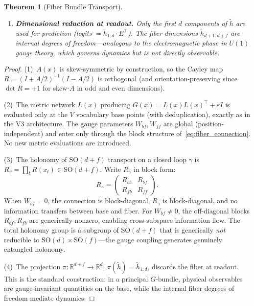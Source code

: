 \documentclass[11pt,letterpaper]{article}
\newtheorem{theorem}[conjecture]{Theorem}
\newcommand{\SO}{\mathrm{SO}}
\begin{document}
\begin{theorem}[Fiber Bundle Transport]
\begin{enumerate}
    \item \textbf{Dimensional reduction at readout.} Only the 
    first $d$ components of $\tilde{h}$ are used for prediction 
    (logits $= \tilde{h}_{1:d} \cdot E^\top$). The fiber 
    dimensions $\tilde{h}_{d+1:d+f}$ are internal degrees of 
    freedom---analogous to the electromagnetic phase in $U(1)$ 
    gauge theory, which governs dynamics but is not directly 
    observable.
\end{enumerate}
\end{theorem}

\begin{proof}
(1)~$A(x)$ is skew-symmetric by construction, so the Cayley map 
$R = (I + A/2)^{-1}(I - A/2)$ is orthogonal (and 
orientation-preserving since $\det R = +1$ for skew-$A$ in odd and 
even dimensions). 

(2)~The metric network $L(x)$ producing $G(x) = L(x)L(x)^\top + 
\varepsilon I$ is evaluated only at the $V$ vocabulary base points 
(with deduplication), exactly as in the V3 architecture. The gauge 
parameters $W_{bf}, W_{ff}$ are global (position-independent) and 
enter only through the block structure 
of~\eqref{eq:fiber_connection}. No new metric evaluations are 
introduced.

(3)~The holonomy of $\SO(d{+}f)$ transport on a closed loop 
$\gamma$ is $R_\gamma = \prod_{t} R(x_t) \in \SO(d{+}f)$. Write 
$R_\gamma$ in block form:
\[
    R_\gamma = \begin{pmatrix} R_{bb} & R_{bf} \\ R_{fb} & R_{ff}
    \end{pmatrix}.
\]
When $W_{bf} = 0$, the connection is block-diagonal, 
$R_\gamma$ is block-diagonal, and no information transfers 
between base and fiber. For $W_{bf} \neq 0$, the off-diagonal 
blocks $R_{bf}, R_{fb}$ are generically nonzero, enabling 
cross-subspace information flow. The total holonomy group is a 
subgroup of $\SO(d{+}f)$ that is generically \emph{not} 
reducible to $\SO(d) \times \SO(f)$---the gauge coupling generates 
genuinely entangled holonomy.

(4)~The projection $\pi: \mathbb{R}^{d+f} \to \mathbb{R}^d$, 
$\pi(\tilde{h}) = \tilde{h}_{1:d}$, discards the fiber at 
readout. This is the standard construction: in a principal 
$G$-bundle, physical observables are gauge-invariant quantities 
on the base, while the internal fiber degrees of freedom mediate 
dynamics.
\end{proof}
\end{document}
